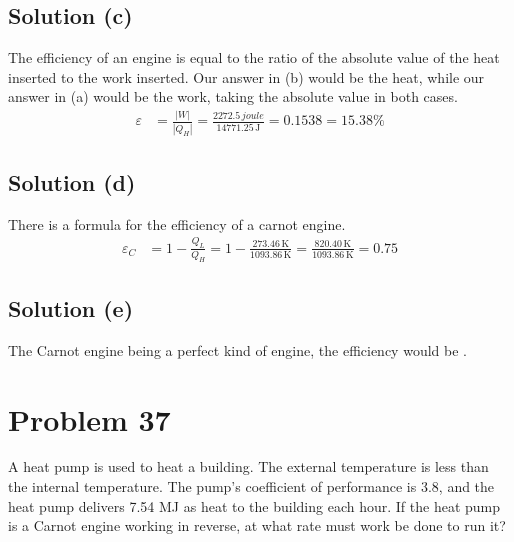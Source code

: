 \documentclass[12pt]{article}
\begin{document}
        \subsection{Solution (c)}
            The efficiency of an engine is equal to the ratio of the absolute value of the heat inserted to the work inserted.
            Our answer in (b) would be the heat, while our answer in (a) would be the work, taking the absolute value in both cases.
            \begin{align}
                \varepsilon &=  \frac{| W |}{| Q_H |}
                    =   \frac{2272.5\,\unit{joule}}{14771.25\,\unit{\joule}}
                    =   0.1538
                    =   \boxed{15.38\%}
            \end{align}

        \subsection{Solution (d)}
            There is a formula for the efficiency of a carnot engine.
            \begin{align}
                \varepsilon_C   &=  1 - \frac{Q_L}{Q_H}
                    =   1 - \frac{273.46\,\unit{\kelvin}}{1093.86\,\unit{\kelvin}}
                    =   \frac{820.40\,\unit{\kelvin}}{1093.86\,\unit{\kelvin}}
                    =   \boxed{0.75}
            \end{align}

        \subsection{Solution (e)}
            The Carnot engine being a perfect kind of engine, the efficiency would be . 

    \pagebreak
    \section{Problem 37}
        A heat pump is used to heat a building. 
        The external temperature is less than the internal temperature. 
        The pump's coefficient of performance is 3.8, and the heat pump delivers 7.54 MJ as heat to the building each hour. 
        If the heat pump is a Carnot engine working in reverse, at what rate must work be done to run it?
\end{document}
